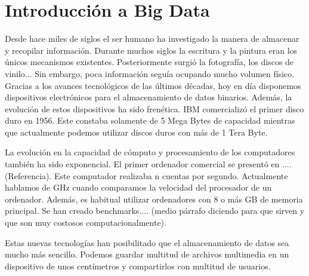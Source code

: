 \documentclass{article}
\begin{document}
\maketitle



\newpage
\tableofcontents
\newpage


\section{Introducción a Big Data}

	Desde hace miles de siglos el ser humano ha investigado la manera de almacenar y recopilar información. Durante muchos siglos la escritura y la pintura eran los únicos mecanismos existentes. Posteriormente surgió la fotografía, los discos de vinilo... Sin embargo, poca información seguía ocupando mucho volumen físico. Gracias a los avances tecnológicos de las últimos décadas, hoy en día disponemos dispositivos electrónicos para el almacenamiento de datos binarios. Además, la evolución de estos dispositivos ha sido frenética. IBM comercializó el primer disco duro en 1956. Este constaba solamente de 5 Mega Bytes de capacidad \cite{hard-disks} mientras que actualmente podemos utilizar discos duros con más de 1 Tera Byte.

	La evolución en la capacidad de cómputo y procesamiento de los computadores también ha sido exponencial. El primer ordenador comercial se presentó en ....(Referencia). Este computador realizaba n cuentas por segundo. Actualmente hablamos de GHz cuando comparamos la velocidad del procesador de un ordenador. Además, es habitual utilizar ordenadores con 8 o más GB de memoria principal. Se han creado benchmarks.... (medio párrafo diciendo para que sirven y que son muy costosos computacionalmente).
	
	Estas nuevas tecnologías han posibilitado que el almacenamiento de datos sea mucho más sencillo. Podemos guardar multitud de archivos multimedia en un dispositivo de unos centímetros y compartirlos con multitud de usuarios. 
	
\end{document}
